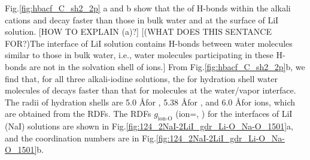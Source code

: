 Fig.\thinspace\ref{fig:hbacf_C_sh2_2p} a and b show that the \CHB of H-bonds within the alkali cations and \I decay faster 
than those in bulk water and at the surface of LiI solution. [HOW TO EXPLAIN (a)?]
[(WHAT DOES THIS SENTANCE FOR?)The interface of LiI solution contains H-bonds between water molecules similar to those in bulk water, i.e.,
water molecules participating in these H-bonds are not in the solvation shell of ions.] 
From Fig.\thinspace\ref{fig:hbacf_C_sh2_2p}b, we find that, for all three alkali-iodine solutions, the \CHB for hydration shell water molecules 
of \I decays faster than that for molecules at the water/vapor interface.
The radii of hydration shells are 5.0 \AA for \li, 5.38 \AA for \na,
and 6.0 \AA for \I ions, which are obtained from the RDFs.
The RDFs $g_{\text{ion-O}}$ (ion=\li, \na) for the interfaces 
of LiI (NaI) solutions are shown in Fig.\thinspace\ref{fig:124_2NaI-2LiI_gdr_Li-O_Na-O_1501}a,
and the coordination numbers are in Fig.\thinspace\ref{fig:124_2NaI-2LiI_gdr_Li-O_Na-O_1501}b.

